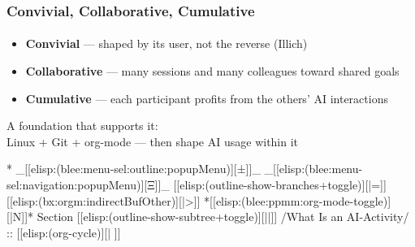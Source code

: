 \begin{whenOrg}
\begin{verblatex}

\begin{frame}[fragile,plain,label=threeCs]
    \frametitle{Convivial, Collaborative, Cumulative}
    \framesubtitle{}

\begin{itemize}
  \item \textbf{Convivial} --- shaped by its user, not the reverse (Illich)
  \item \textbf{Collaborative} --- many sessions and many colleagues toward shared goals
  \item \textbf{Cumulative} --- each participant profits from the others' AI interactions
  \end{itemize}

  \vspace{0.15in}
  A foundation that supports it:\\
  \hspace{0.2in} Linux + Git + org-mode --- then shape AI usage within it


\end{frame}
\end{verblatex}



\begin{whenOrg}
*  _[[elisp:(blee:menu-sel:outline:popupMenu)][±]]_ _[[elisp:(blee:menu-sel:navigation:popupMenu)][Ξ]]_ [[elisp:(outline-show-branches+toggle)][|=]] [[elisp:(bx:orgm:indirectBufOther)][|>]] *[[elisp:(blee:ppmm:org-mode-toggle)][|N]]*  Section    [[elisp:(outline-show-subtree+toggle)][||]]   /What Is an AI-Activity/ ::  [[elisp:(org-cycle)][| ]]
\end{whenOrg}


\end{whenOrg}
